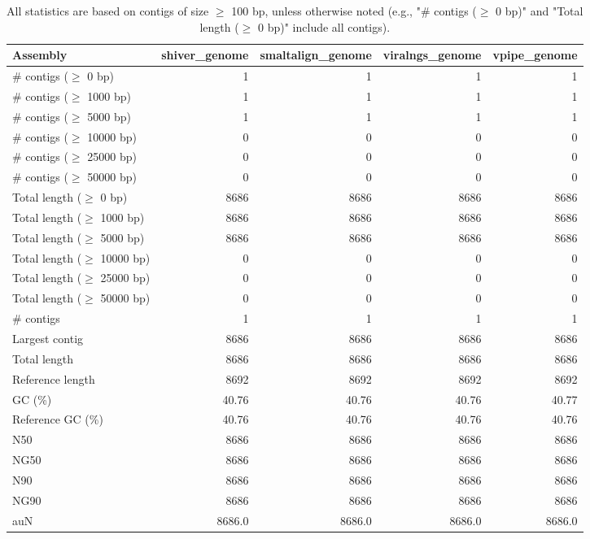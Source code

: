 \documentclass[12pt,a4paper]{article}
\begin{document}
\begin{table}[ht]
\begin{center}
\caption{All statistics are based on contigs of size $\geq$ 100 bp, unless otherwise noted (e.g., "\# contigs ($\geq$ 0 bp)" and "Total length ($\geq$ 0 bp)" include all contigs).}
\begin{tabular}{|l*{4}{|r}|}
\hline
Assembly & shiver\_genome & smaltalign\_genome & viralngs\_genome & vpipe\_genome \\ \hline
\# contigs ($\geq$ 0 bp) & 1 & 1 & 1 & 1 \\ \hline
\# contigs ($\geq$ 1000 bp) & 1 & 1 & 1 & 1 \\ \hline
\# contigs ($\geq$ 5000 bp) & 1 & 1 & 1 & 1 \\ \hline
\# contigs ($\geq$ 10000 bp) & 0 & 0 & 0 & 0 \\ \hline
\# contigs ($\geq$ 25000 bp) & 0 & 0 & 0 & 0 \\ \hline
\# contigs ($\geq$ 50000 bp) & 0 & 0 & 0 & 0 \\ \hline
Total length ($\geq$ 0 bp) & 8686 & 8686 & 8686 & 8686 \\ \hline
Total length ($\geq$ 1000 bp) & 8686 & 8686 & 8686 & 8686 \\ \hline
Total length ($\geq$ 5000 bp) & 8686 & 8686 & 8686 & 8686 \\ \hline
Total length ($\geq$ 10000 bp) & 0 & 0 & 0 & 0 \\ \hline
Total length ($\geq$ 25000 bp) & 0 & 0 & 0 & 0 \\ \hline
Total length ($\geq$ 50000 bp) & 0 & 0 & 0 & 0 \\ \hline
\# contigs & 1 & 1 & 1 & 1 \\ \hline
Largest contig & 8686 & 8686 & 8686 & 8686 \\ \hline
Total length & 8686 & 8686 & 8686 & 8686 \\ \hline
Reference length & 8692 & 8692 & 8692 & 8692 \\ \hline
GC (\%) & 40.76 & 40.76 & 40.76 & 40.77 \\ \hline
Reference GC (\%) & 40.76 & 40.76 & 40.76 & 40.76 \\ \hline
N50 & 8686 & 8686 & 8686 & 8686 \\ \hline
NG50 & 8686 & 8686 & 8686 & 8686 \\ \hline
N90 & 8686 & 8686 & 8686 & 8686 \\ \hline
NG90 & 8686 & 8686 & 8686 & 8686 \\ \hline
auN & 8686.0 & 8686.0 & 8686.0 & 8686.0 \\ \hline

\end{tabular}
\end{center}
\end{table}
\end{document}
